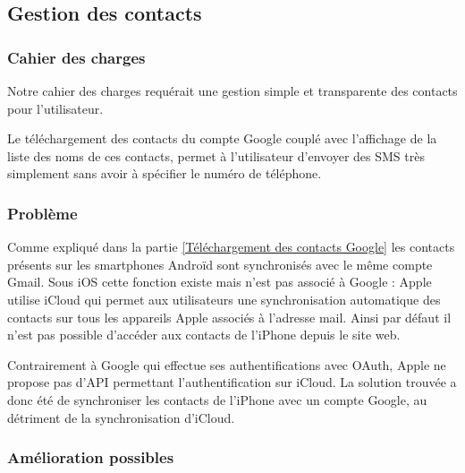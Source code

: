 \subsection{Gestion des contacts}


\subsubsection{Cahier des charges}

Notre cahier des charges requérait une gestion simple et transparente des contacts pour l'utilisateur.

Le téléchargement des contacts du compte Google couplé avec l'affichage de la liste des noms de ces contacts, permet à l'utilisateur d'envoyer des SMS très simplement sans avoir à spécifier le numéro de téléphone.


\subsubsection{Problème}

Comme expliqué dans la partie \ref{Téléchargement des contacts Google} les contacts présents sur les smartphones Androïd sont synchronisés avec le même compte Gmail.
Sous iOS cette fonction existe mais n'est pas associé à Google : Apple utilise iCloud qui permet aux utilisateurs une synchronisation automatique des contacts sur tous les appareils Apple associés à l'adresse mail.
Ainsi par défaut il n'est pas possible d'accéder aux contacts de l'iPhone depuis le site web.

Contrairement à Google qui effectue ses authentifications avec OAuth, Apple ne propose pas d'API permettant l'authentification sur iCloud.
La solution trouvée a donc été de synchroniser les contacts de l'iPhone avec un compte Google, au détriment de la synchronisation d'iCloud.


\subsubsection{Amélioration possibles}


